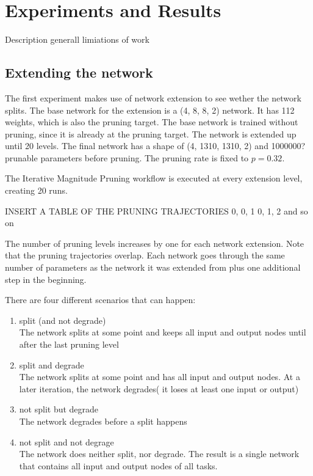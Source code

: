 \section{Experiments and Results}
Description generall
limiations of work
\subsection{Extending the network}
The first experiment makes use of network extension to see wether the network splits.
The base network for the extension is a (4, 8, 8, 2) network. 
It has 112 weights, which is also the pruning target.
The base network is trained without pruning, since it is already at the pruning target.
The network is extended up until 20 levels.
The final network has a shape of (4, 1310, 1310, 2) and 1000000? prunable parameters before pruning.
The pruning rate is fixed to $p=0.32$.

The Iterative Magnitude Pruning workflow is executed at every extension level, creating 20 runs.

INSERT A TABLE OF THE PRUNING TRAJECTORIES 
0, 
0, 1
0, 1, 2 and so on 

The number of pruning levels increases by one for each network extension.
Note that the pruning trajectories overlap.
Each network goes through the same number of parameters as the network it was extended from plus one additional step in the beginning.

There are four different scenarios that can happen:
\begin{enumerate}
    \item split (and not degrade) \\
    The network splits at some point and keeps all input and output nodes until after the last pruning level 
    \item split and degrade \\
    The network splits at some point and has all input and output nodes.
    At a later iteration, the network degrades( it loses at least one input or output)
    \item not split but degrade \\
    The network degrades before a split happens
    \item not split and not degrage \\
    The network does neither split, nor degrade. 
    The result is a single network that contains all input and output nodes of all tasks.
\end{enumerate}

